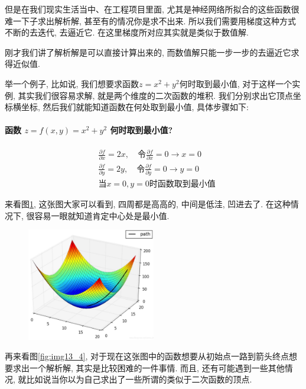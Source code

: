 但是在我们现实生活当中、在工程项目里面, 尤其是神经网络所拟合的这些函数很难一下子求出解析解, 甚至有的情况你是求不出来. 所以我们需要用梯度这种方式不断的去迭代, 去逼近它.  在这里梯度所对应其实就是类似于数值解. 

刚才我们讲了解析解是可以直接计算出来的, 而数值解只能一步一步的去逼近它求得近似值. 

举一个例子, 比如说, 我们想要求函数$z=x^2+y^2$何时取到最小值, 对于这样一个实例, 其实我们很容易求解, 就是两个维度的二次函数的堆积. 我们分别求出它顶点坐标横坐标, 然后我们就能知道函数在何处取到最小值, 具体步骤如下:
\paragraph{函数 $z = f(x, y) = x^2 + y^2$ 何时取到最小值?}
\begin{align*}
  & \frac{\partial f}{\partial x} = 2x, \quad \mbox{令}\frac{\partial f}{\partial x} = 0 \to x = 0\\
  & \frac{\partial f}{\partial y} = 2y, \quad \mbox{令}\frac{\partial f}{\partial y} = 0 \to y = 0 \\
  & \mbox{当}x=0, y=0\mbox{时函数取到最小值}
\end{align*}

来看图\ref{fig:img13_3}, 这张图大家可以看到, 四周都是高高的, 中间是低洼, 凹进去了. 在这种情况下, 很容易一眼就知道肯定中心处是最小值. 

\begin{figure}[ht]
  \centering
  \includegraphics[width=0.5\textwidth]{asset/20230902170354.png}
  \caption{}
  \label{fig:img13_3}
\end{figure}

再来看图\ref{fig:img13_4}, 对于现在这张图中的函数想要从初始点一路到箭头终点想要求出一个解析解, 其实是比较困难的一件事情. 而且, 还有可能遇到一些其他情况, 就比如说当你以为自己求出了一些所谓的类似于二次函数的顶点.

